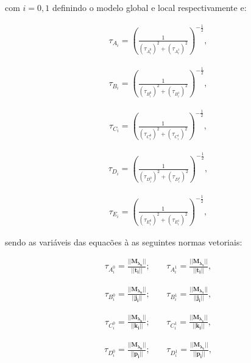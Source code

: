 \documentclass[tese_patricia]{subfiles}
\begin{document}
\noindent com $i=0,1$ definindo o modelo global e local respectivamente e:

\begin{align}
	\tau_{A_{i}} = \left(\frac{1}{\left(\tau_{A_i^{0}}\right)^{2} + \left(\tau_{A_i^{1}}\right)^{2}} \right)^{-\frac{1}{2}}, \label{eq:tAi}
\end{align}

\begin{align}
	\tau_{B_{i}} = \left(\frac{1}{\left(\tau_{B_i^{0}}\right)^{2} + \left(\tau_{B_i^{1}}\right)^{2}} \right)^{-\frac{1}{2}},
\end{align}

\begin{align}
	\tau_{C_{i}} = \left(\frac{1}{\left(\tau_{C_i^{0}}\right)^{2} + \left(\tau_{C_i^{1}}\right)^{2}} \right)^{-\frac{1}{2}},
\end{align}

\begin{align}
	\tau_{D_{i}} = \left(\frac{1}{\left(\tau_{D_i^{0}}\right)^{2} + \left(\tau_{D_i^{1}}\right)^{2}} \right)^{-\frac{1}{2}},
\end{align}

\begin{align}
	\tau_{E_{i}} = \left(\frac{1}{\left(\tau_{E_i^{0}}\right)^{2} + \left(\tau_{E_i^{1}}\right)^{2}} \right)^{-\frac{1}{2}},\label{eq:tEi}
\end{align}

\noindent sendo as variáveis das equacões  à  as seguintes normas vetoriais:

\begin{align}
	\tau_{A_i^{0}} = \frac{|| \mathbf{M_{\lambda_0}} || }{||\mathbf{t_{i}} ||}; \ \ \ \ \  & \tau_{A_i^{1}} = \frac{|| \mathbf{M_{\lambda_1}} || }{||\mathbf{t_{i}} ||}  ,
\end{align}


\begin{align}
	\tau_{B_i^{0}} = \frac{|| \mathbf{M_{\lambda_0}} || }{||\mathbf{j_{i}} ||}; \ \ \ \ \  &  \tau_{B_i^{1}} = \frac{|| \mathbf{M_{\lambda_1}} || }{||\mathbf{j_{i}} ||}, 
\end{align}

\begin{align}
	\tau_{C_i^{0}} = \frac{|| \mathbf{M_{\lambda_0}} || }{||\mathbf{k_{i}} ||}; \ \ \ \ \  & \tau_{C_i^{1}} = \frac{|| \mathbf{M_{\lambda_1}} || }{||\mathbf{k_{i}} ||},
\end{align}


\begin{align}
	\tau_{D_i^{0}} = \frac{|| \mathbf{M_{\lambda_0}} || }{||\mathbf{p_{i}} ||}; \ \ \ \ \  & \tau_{D_i^{1}} = \frac{|| \mathbf{M_{\lambda_1}} || }{||\mathbf{p_{i}} ||}, 
\end{align}
\end{document}
